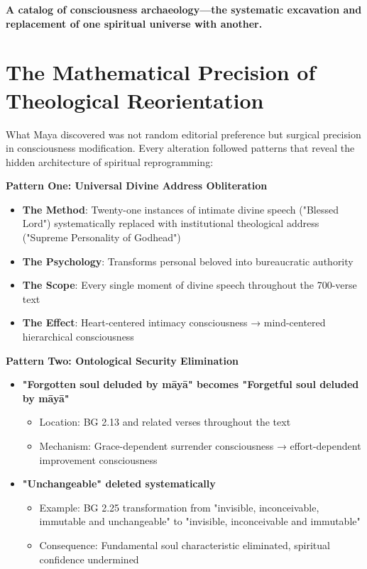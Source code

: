 \documentclass[11pt,twoside]{book}
\begin{document}
\textbf{A catalog of consciousness archaeology—the systematic excavation and replacement of one spiritual universe with another.}
\section*{The Mathematical Precision of Theological Reorientation}
\label{sec:org26fa2b1}

What Maya discovered was not random editorial preference but surgical precision in consciousness modification. Every alteration followed patterns that reveal the hidden architecture of spiritual reprogramming:

\textbf{\textbf{Pattern One: Universal Divine Address Obliteration}}
\begin{itemize}
\item \textbf{\textbf{The Method}}: Twenty-one instances of intimate divine speech ("Blessed Lord") systematically replaced with institutional theological address ("Supreme Personality of Godhead")
\item \textbf{\textbf{The Psychology}}: Transforms personal beloved into bureaucratic authority
\item \textbf{\textbf{The Scope}}: Every single moment of divine speech throughout the 700-verse text
\item \textbf{\textbf{The Effect}}: Heart-centered intimacy consciousness → mind-centered hierarchical consciousness
\end{itemize}

\textbf{\textbf{Pattern Two: Ontological Security Elimination}}  
\begin{itemize}
\item \textbf{\textbf{"Forgotten soul deluded by māyā" becomes "Forgetful soul deluded by māyā"}}
\begin{itemize}
\item Location: BG 2.13 and related verses throughout the text
\item Mechanism: Grace-dependent surrender consciousness → effort-dependent improvement consciousness
\end{itemize}

\item \textbf{\textbf{"Unchangeable" deleted systematically}}
\begin{itemize}
\item Example: BG 2.25 transformation from "invisible, inconceivable, immutable and unchangeable" to "invisible, inconceivable and immutable"
\item Consequence: Fundamental soul characteristic eliminated, spiritual confidence undermined
\end{itemize}
\end{itemize}
\end{document}
